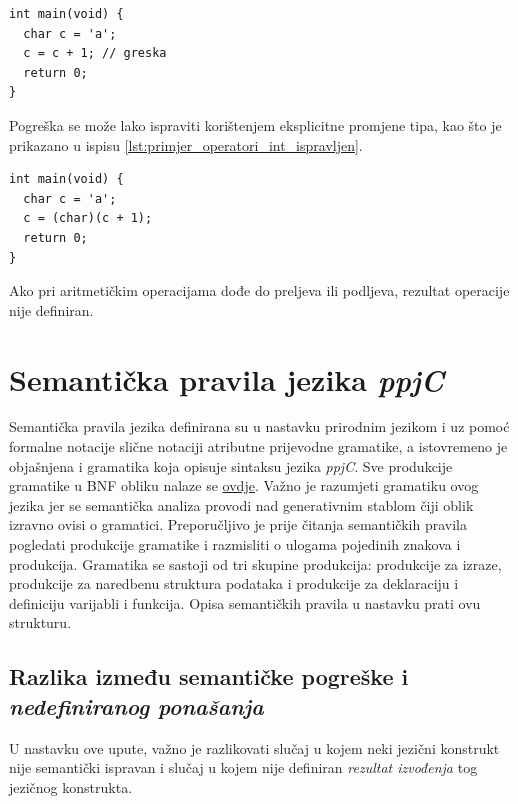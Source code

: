 \documentclass[times, 12pt, utf8]{book}
\begin{document}
\begin{lstlisting}[caption={Neispravan program s operatorom zbrajanja.},label=lst:primjer_operatori_int]
int main(void) {
  char c = 'a';
  c = c + 1; // greska
  return 0;
}
\end{lstlisting}

Pogreška se može lako ispraviti korištenjem eksplicitne promjene tipa, kao što je prikazano u ispisu \ref{lst:primjer_operatori_int_ispravljen}.

\begin{lstlisting}[caption={Ispravljen program iz ispisa \ref{lst:primjer_operatori_int}.},label=lst:primjer_operatori_int_ispravljen]
int main(void) {
  char c = 'a';
  c = (char)(c + 1);
  return 0;
}
\end{lstlisting}

Ako pri aritmetičkim operacijama dođe do preljeva ili podljeva, rezultat operacije nije definiran.

\section{Semantička pravila jezika \emph{ppjC}}\label{sec:semanticka_pravila}
Semantička pravila jezika definirana su u nastavku prirodnim jezikom i uz pomoć formalne notacije slične notaciji atributne prijevodne gramatike, a istovremeno je objašnjena i gramatika koja opisuje sintaksu jezika \emph{ppjC}.
Sve produkcije gramatike u BNF obliku nalaze se \href{https://github.com/fer-ppj/ppj-labosi/raw/master/res/lab3/bnf.txt}{ovdje}.
Važno je razumjeti gramatiku ovog jezika jer se semantička analiza provodi nad generativnim stablom čiji oblik izravno ovisi o gramatici.
Preporučljivo je prije čitanja semantičkih pravila pogledati produkcije gramatike i razmisliti o ulogama pojedinih znakova i produkcija.
Gramatika se sastoji od tri skupine produkcija: produkcije za izraze, produkcije za naredbenu struktura podataka i produkcije za deklaraciju i definiciju varijabli i funkcija.
Opisa semantičkih pravila u nastavku prati ovu strukturu.

\subsection{Razlika između semantičke pogreške i \emph{nedefiniranog ponašanja}}\label{sec:UB}
U nastavku ove upute, važno je razlikovati slučaj u kojem neki jezični konstrukt nije semantički ispravan i slučaj u kojem nije definiran \emph{rezultat izvođenja} tog jezičnog konstrukta. 
\end{document}
